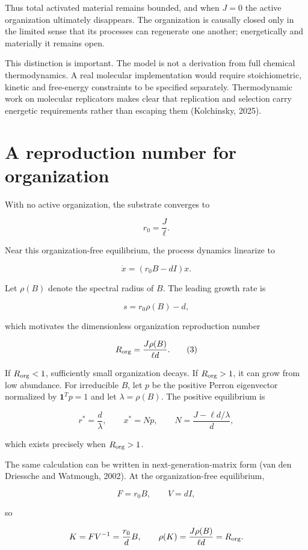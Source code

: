 \documentclass[11pt]{article}
\begin{document}
Thus total activated material remains bounded, and when \(J = 0\) the
active organization ultimately disappears. The organization is causally
closed only in the limited sense that its processes can regenerate one
another; energetically and materially it remains open.

This distinction is important. The model is not a derivation from full
chemical thermodynamics. A real molecular implementation would require
stoichiometric, kinetic and free-energy constraints to be specified
separately. Thermodynamic work on molecular replicators makes clear that
replication and selection carry energetic requirements rather than
escaping them (Kolchinsky, 2025).

\section{A reproduction number for
organization}
With no active organization, the substrate converges to

\[
r_0 = \frac{J}{\ell}.
\]

Near this organization-free equilibrium, the process dynamics linearize
to

\[
\dot{x} = (r_0 B - dI)x.
\]

Let \(\rho(B)\) denote the spectral radius of \(B\). The leading growth
rate is

\[
s = r_0 \rho(B) - d,
\]

which motivates the dimensionless organization reproduction number

\[
R_{\rm org} = \frac{J\rho(B)}{\ell d}. \tag{3}
\]

If \(R_{\rm org} < 1\), sufficiently small organization decays. If
\(R_{\rm org} > 1\), it can grow from low abundance. For irreducible
\(B\), let \(p\) be the positive Perron eigenvector normalized by
\(\mathbf{1}^T p = 1\) and let \(\lambda = \rho(B)\). The positive
equilibrium is

\[
r^* = \frac{d}{\lambda}, \qquad x^* = Np, \qquad N = \frac{J - \ell d/\lambda}{d},
\]

which exists precisely when \(R_{\rm org} > 1\).

The same calculation can be written in next-generation-matrix form (van
den Driessche and Watmough, 2002). At the organization-free equilibrium,

\[
F = r_0 B, \qquad V = dI,
\]

so

\[
K = FV^{-1} = \frac{r_0}{d}B, \qquad \rho(K) = \frac{J\rho(B)}{\ell d} = R_{\rm org}.
\]
\end{document}
